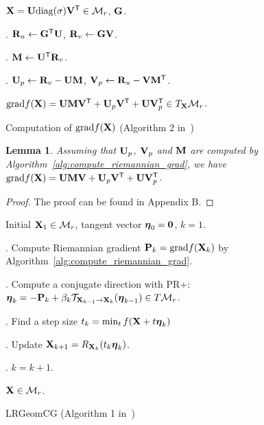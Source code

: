 \documentclass[letterpaper]{article}
\newtheorem{lemma}{Lemma}
\def\M{\mathcal{M}}
\def\bR{{\bf R}}
\def\U{{\bf U}}
\def\V{{\bf V}}
\def\diag{\mbox{diag}}
\def\trsp{{\sf T}}
\def\0{{\bf 0}}
\def\G{{\bf G}}
\def\grad{{\text{grad}}}
\def\bfeta{\mbox{{\boldmath $\eta$}}}
\def\mT{{\mathcal T}}
\def\bM{{\bf M}}
\def\bX{{\bf X}}
\def\bX{{\bf X}}
\def\bP{{\bf P}}
\begin{document}
\begin{algorithm}
  \begin{algorithmic}
    \REQUIRE $\bX = \U \diag(\sigma) \V^{\trsp} \in \M_{r}$, $\G$.
    
    . $\bR_{u} \leftarrow \G^{\trsp} \U$, $\bR_{v} \leftarrow \G \V$.
    
    . $\bM \leftarrow \U^{\trsp} \bR_{v}$.
    
    . $\U_{p} \leftarrow \bR_{v} - \U \bM$, $\V_{p} \leftarrow \bR_{u} - \V \bM^{\trsp}$.

    \ENSURE $\grad f(\bX) = \U \bM \V^{\trsp} + \U_{p} \V^{\trsp} + \U \V_{p}^{\trsp} \in T_{\bX}\M_{r}$.
    
  \end{algorithmic}
  \caption{Computation of $\grad f(\bX)$ (Algorithm 2 in~\cite{vandereycken2013lowrank})}
  \label{alg:compute_riemannian_grad}
\end{algorithm}



\begin{lemma}
  Assuming that $\U_{p}$, $\V_{p}$ and $\bM$ are computed by Algorithm~\ref{alg:compute_riemannian_grad},
  we have ${\textnormal{grad}} f(\bX) = \U \bM \V + \U_{p} \V^{\trsp} + \U \V^{\trsp}_{p}$.
\end{lemma}

\begin{proof}
  The proof can be found in Appendix B.
\end{proof}



\begin{algorithm}
  \begin{algorithmic}
    \REQUIRE Initial $\bX_{1} \in \M_{r}$, tangent vector $\bfeta_{0} = \0$, $k = 1$.
    
      
      . Compute Riemannian gradient $\bP_{k} = \grad f(\bX_{k})$ by Algorithm~\ref{alg:compute_riemannian_grad}.
      
      . Compute a conjugate direction with PR+:
             $\bfeta_k = - \bP_{k} + \beta_{k} \mT_{\bX_{k-1} \rightarrow \bX_{k}}( \bfeta_{k-1}) \in T\M_{r}$.
             
      . Find a step size $t_{k} = \min_{t} f(\bX + t\bfeta_{k}) $

      . Update $\bX_{k+1} = R_{\bX_{k}}(t_{k} \bfeta_{k})$.
      
      . $k = k + 1$.
      
    \ENDWHILE

    \ENSURE $\bX \in \M_{r}$.

  \end{algorithmic}
  \caption{LRGeomCG (Algorithm 1 in~\cite{vandereycken2013lowrank})}
  \label{alg:LRGeomCG}
\end{algorithm}
\end{document}
